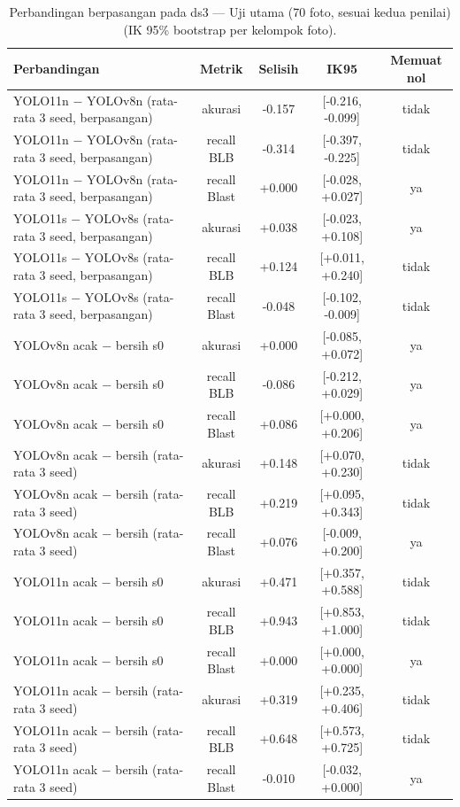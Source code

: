 \begin{table}[!t]
\centering
\caption{Perbandingan berpasangan pada ds3 — Uji utama (70 foto, sesuai kedua penilai) (IK 95\% bootstrap per kelompok foto).}
\label{tab:ds3_utama_banding}
\footnotesize
\begin{tabular}{lcccc}
\hline
\textbf{Perbandingan} & \textbf{Metrik} & \textbf{Selisih} & \textbf{IK95} & \textbf{Memuat nol} \\
\hline
YOLO11n − YOLOv8n (rata-rata 3 seed, berpasangan) & akurasi & -0.157 & [-0.216, -0.099] & tidak \\
YOLO11n − YOLOv8n (rata-rata 3 seed, berpasangan) & recall BLB & -0.314 & [-0.397, -0.225] & tidak \\
YOLO11n − YOLOv8n (rata-rata 3 seed, berpasangan) & recall Blast & +0.000 & [-0.028, +0.027] & ya \\
YOLO11s − YOLOv8s (rata-rata 3 seed, berpasangan) & akurasi & +0.038 & [-0.023, +0.108] & ya \\
YOLO11s − YOLOv8s (rata-rata 3 seed, berpasangan) & recall BLB & +0.124 & [+0.011, +0.240] & tidak \\
YOLO11s − YOLOv8s (rata-rata 3 seed, berpasangan) & recall Blast & -0.048 & [-0.102, -0.009] & tidak \\
YOLOv8n acak − bersih s0 & akurasi & +0.000 & [-0.085, +0.072] & ya \\
YOLOv8n acak − bersih s0 & recall BLB & -0.086 & [-0.212, +0.029] & ya \\
YOLOv8n acak − bersih s0 & recall Blast & +0.086 & [+0.000, +0.206] & ya \\
YOLOv8n acak − bersih (rata-rata 3 seed) & akurasi & +0.148 & [+0.070, +0.230] & tidak \\
YOLOv8n acak − bersih (rata-rata 3 seed) & recall BLB & +0.219 & [+0.095, +0.343] & tidak \\
YOLOv8n acak − bersih (rata-rata 3 seed) & recall Blast & +0.076 & [-0.009, +0.200] & ya \\
YOLO11n acak − bersih s0 & akurasi & +0.471 & [+0.357, +0.588] & tidak \\
YOLO11n acak − bersih s0 & recall BLB & +0.943 & [+0.853, +1.000] & tidak \\
YOLO11n acak − bersih s0 & recall Blast & +0.000 & [+0.000, +0.000] & ya \\
YOLO11n acak − bersih (rata-rata 3 seed) & akurasi & +0.319 & [+0.235, +0.406] & tidak \\
YOLO11n acak − bersih (rata-rata 3 seed) & recall BLB & +0.648 & [+0.573, +0.725] & tidak \\
YOLO11n acak − bersih (rata-rata 3 seed) & recall Blast & -0.010 & [-0.032, +0.000] & ya \\
\hline
\end{tabular}
\end{table}
